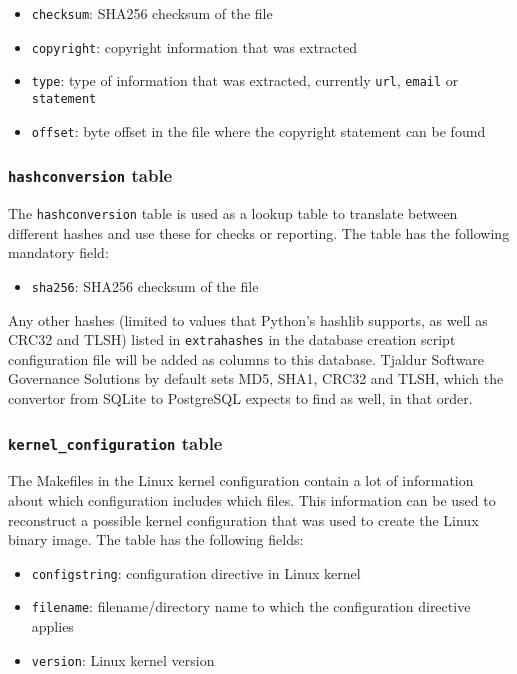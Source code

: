 \documentclass[10pt,a4paper]{article}
\begin{document}
\begin{itemize}
\item \texttt{checksum}: SHA256 checksum of the file
\item \texttt{copyright}: copyright information that was extracted
\item \texttt{type}: type of information that was extracted, currently
\texttt{url}, \texttt{email} or \texttt{statement}
\item \texttt{offset}: byte offset in the file where the copyright statement
can be found
\end{itemize}

\subsubsection{\texttt{hashconversion} table}

The \texttt{hashconversion} table is used as a lookup table to translate
between different hashes and use these for checks or reporting. The
table has the following mandatory field:

\begin{itemize}
\item \texttt{sha256}: SHA256 checksum of the file
\end{itemize}

Any other hashes (limited to values that Python's hashlib supports, as well as
CRC32 and TLSH) listed in \texttt{extrahashes} in the database creation script
configuration file will be added as columns to this database. Tjaldur Software
Governance Solutions by default sets MD5, SHA1, CRC32 and TLSH, which the
convertor from SQLite to PostgreSQL expects to find as well, in that order.

\subsubsection{\texttt{kernel\_configuration} table}

The Makefiles in the Linux kernel configuration contain a lot of information
about which configuration includes which files. This information can be used to
reconstruct a possible kernel configuration that was used to create the Linux
binary image. The table has the following fields:

\begin{itemize}
\item \texttt{configstring}: configuration directive in Linux kernel
\item \texttt{filename}: filename/directory name to which the configuration
directive applies
\item \texttt{version}: Linux kernel version
\end{itemize}
\end{document}
